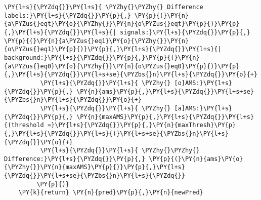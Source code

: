 \begin{notebookcell}[]
\begin{addmargin}[\cellleftmargin]{0em}
{\begin{Verbatim}[commandchars=\\\{\}]
          \PY{l+s}{\PYZdq{}}\PY{l+s}{ \PYZhy{}\PYZhy{} Difference labels:}\PY{l+s}{\PYZdq{}}\PY{p}{,} \PY{p}{(}\PY{n}{a\PYZus{}eqt}\PY{o}{\PYZhy{}}\PY{n}{o\PYZus{}eqt}\PY{p}{)}\PY{p}{,}\PY{l+s}{\PYZdq{}}\PY{l+s}{| signals:}\PY{l+s}{\PYZdq{}}\PY{p}{,} \PY{p}{(}\PY{n}{a\PYZus{}eq1}\PY{o}{\PYZhy{}}\PY{n}{o\PYZus{}eq1}\PY{p}{)}\PY{p}{,}\PY{l+s}{\PYZdq{}}\PY{l+s}{| background:}\PY{l+s}{\PYZdq{}}\PY{p}{,}\PY{p}{(}\PY{n}{a\PYZus{}eq0}\PY{o}{\PYZhy{}}\PY{n}{o\PYZus{}eq0}\PY{p}{)}\PY{p}{,}\PY{l+s}{\PYZdq{}}\PY{l+s+se}{\PYZbs{}n}\PY{l+s}{\PYZdq{}}\PY{o}{+}
          \PY{l+s}{\PYZdq{}}\PY{l+s}{ \PYZhy{} [o]AMS:}\PY{l+s}{\PYZdq{}}\PY{p}{,} \PY{n}{ams}\PY{p}{,}\PY{l+s}{\PYZdq{}}\PY{l+s+se}{\PYZbs{}n}\PY{l+s}{\PYZdq{}}\PY{o}{+}
          \PY{l+s}{\PYZdq{}}\PY{l+s}{ \PYZhy{} [a]AMS:}\PY{l+s}{\PYZdq{}}\PY{p}{,} \PY{n}{maxAMS}\PY{p}{,}\PY{l+s}{\PYZdq{}}\PY{l+s}{(threshold =}\PY{l+s}{\PYZdq{}}\PY{p}{,}\PY{n}{maxThresh}\PY{p}{,}\PY{l+s}{\PYZdq{}}\PY{l+s}{)}\PY{l+s+se}{\PYZbs{}n}\PY{l+s}{\PYZdq{}}\PY{o}{+}
          \PY{l+s}{\PYZdq{}}\PY{l+s}{ \PYZhy{}\PYZhy{} Difference:}\PY{l+s}{\PYZdq{}}\PY{p}{,} \PY{p}{(}\PY{n}{ams}\PY{o}{\PYZhy{}}\PY{n}{maxAMS}\PY{p}{)}\PY{p}{,}\PY{l+s}{\PYZdq{}}\PY{l+s+se}{\PYZbs{}n}\PY{l+s}{\PYZdq{}}
         \PY{p}{)}
    \PY{k}{return} \PY{n}{pred}\PY{p}{,}\PY{n}{newPred}
\end{Verbatim}
%
\par%
\vspace{-1\smallerfontscale}}%
\end{addmargin}
\end{notebookcell}



